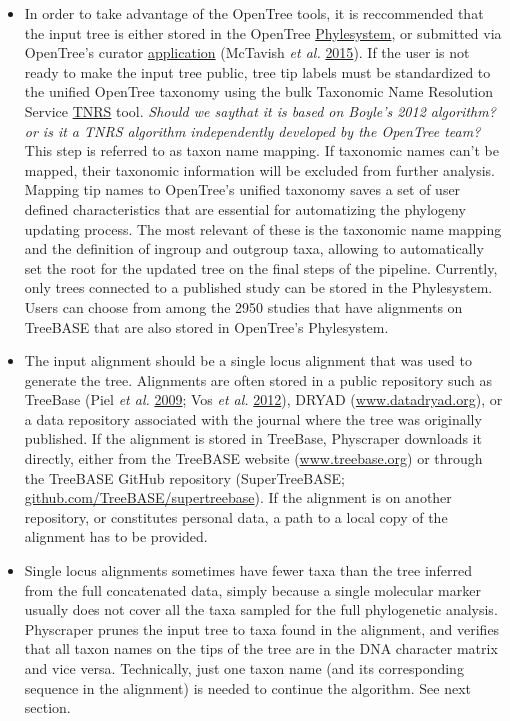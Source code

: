 \documentclass[]{article}
\begin{document}
\begin{itemize}
\item
  In order to take advantage of the OpenTree tools, it is reccommended that the input tree is either stored in the
  OpenTree \href{https://github.com/opentreeoflife/phylesystem}{Phylesystem}, or submitted via OpenTree's curator \href{https://tree.opentreeoflife.org/curator}{application} (McTavish \emph{et al.} \protect\hyperlink{ref-mctavish2015phylesystem}{2015}). If the user is not ready to make the input tree public, tree tip labels must be standardized to the unified OpenTree taxonomy using the bulk Taxonomic Name Resolution Service \href{https://tree.opentreeoflife.org/curator/tnrs/}{TNRS} tool. \emph{Should we saythat it is based on Boyle's 2012 algorithm? or is it a TNRS algorithm independently developed by the OpenTree team?}
  This step is referred to as taxon name mapping. If taxonomic names can't be mapped, their taxonomic information will be excluded from further analysis.
  Mapping tip names to OpenTree's unified taxonomy saves a set of user defined characteristics
  that are essential for automatizing the phylogeny updating process. The most relevant of these is the taxonomic name mapping and the definition of ingroup and outgroup taxa, allowing to automatically set the root for the updated tree on the final steps of the pipeline. Currently, only trees connected to a published study can be stored in the Phylesystem.
  Users can choose from among the 2950 studies that have alignments on
  TreeBASE that are also stored in OpenTree's Phylesystem.
\item
  The input alignment should be a single locus alignment that was used to generate the tree. Alignments are often stored in a public repository such as TreeBase (Piel \emph{et al.} \protect\hyperlink{ref-piel2009treebase}{2009}; Vos \emph{et al.} \protect\hyperlink{ref-vos2012nexml}{2012}),
  DRYAD (\href{http://datadryad.org/}{www.datadryad.org}), or a data repository associated with the journal where the tree was originally published.
  If the alignment is stored in TreeBase, Physcraper downloads it directly,
  either from the TreeBASE website (\href{https://treebase.org/}{www.treebase.org})
  or through the TreeBASE GitHub repository (SuperTreeBASE; \href{https://github.com/TreeBASE/supertreebase}{github.com/TreeBASE/supertreebase}).
  If the alignment is on another repository, or constitutes personal data, a path to a local copy of the alignment has to be provided.
\item
  Single locus alignments sometimes have fewer taxa than the tree inferred from the full concatenated data, simply because a single molecular marker usually does not cover all the taxa sampled for the full phylogenetic analysis. Physcraper prunes the input tree to taxa found in the alignment, and verifies that all taxon names on the tips of the tree are in the DNA character matrix and vice versa. Technically, just one taxon name (and its corresponding sequence in the alignment) is needed to continue the algorithm. See next section.

\end{itemize}
\end{document}
